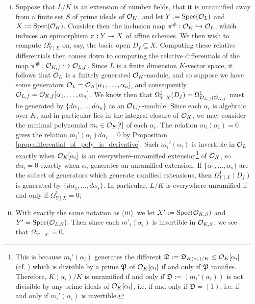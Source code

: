 \begin{eg}
\begin{enumerate}[(i)]
		\item Suppose that $L/K$ is an extension of number fields, that it is unramified away from a finite set $S$ of prime ideals of $\mathcal{O}_K$, and let $Y := \mathrm{Spec}(\mathcal{O}_L)$ and $X := \mathrm{Spec}(\mathcal{O}_K)$. Consider then the inclusion map $\pi^{\#} :\mathcal{O}_K \hookrightarrow \mathcal{O}_L$, which induces an epimorphism $\pi : Y \twoheadrightarrow X$ of affine schemes. We then wish to compute $\Omega^1_{Y \mid X}$ on, say, the basic open $D_f \subseteq X$. Computing these relative differentials then comes down to computing the relative differentials of the map $\pi^{\#} : \mathcal{O}_{K, f} \hookrightarrow \mathcal{O}_{L, f}$. Since $L$ is a finite dimension $K$-vector space, it follows that $\mathcal{O}_L$ is a finitely generated $\mathcal{O}_K$-module, and so suppose we have some generators $\mathcal{O}_L = \mathcal{O}_K[\alpha_1, \ldots, \alpha_n]$, and consequently $\mathcal{O}_{L, f} = \mathcal{O}_{K, f}[\alpha_1, \ldots, \alpha_n]$. We know then that $\Omega^1_{Y \mid X}(D_f) = \Omega^1_{\mathcal{O}_{L, f} \mid \mathcal{O}_{K, f}}$ must be generated by $\{d\alpha_1, \ldots, d\alpha_n\}$ as an $\mathcal{O}_{L, f}$-module. Since each $\alpha_i$ is algebraic over $K$, and in particular lies in the integral closure of $\mathcal{O}_K$, we may consider the minimal polynomial $m_i \in \mathcal{O}_K[t]$ of each $\alpha_i$. The relation $m_i(\alpha_i)=0$ gives the relation $m_i'(\alpha_i) d\alpha_i = 0$ by Proposition \ref{prop:differential_of_poly_is_derivative}. Such $m_i'(\alpha_i)$ is invertible in $\mathcal{O}_L$ exactly when $\mathcal{O}_K[\alpha_i]$ is an everywhere-unramified extension\footnote{This is because $m_i'(\alpha_i)$ generates the different $\mathfrak{D} := \mathfrak{D}_{K(\alpha_i)/K} \trianglelefteq \mathcal{O}_{K}[\alpha_i]$ (cf. \cite[Prop. I.4.6(i)]{casselsFrohlich67}) which is divisible by a prime $\mathfrak{P}$ of $\mathcal{O}_K[\alpha_i]$ if and only if $\mathfrak{P}$ ramifies. Therefore, $K(\alpha_i)/K$ is unramified if and only if $\mathfrak{D} :=(m_i'(\alpha_i))$ is not divisible by any prime ideals of $\mathcal{O}_K[\alpha_i]$, i.e. if and only if $\mathfrak{D} = (1)$, i.e. if and only if $m_i'(\alpha_i)$ is invertible.} of $\mathcal{O}_K$, so $d\alpha_i =0$ exactly when $\alpha_i$ generates an unramified extension. If $\{\alpha_1, \ldots, \alpha_s\}$ are the subset of generators which generate ramified extensions, then $\Omega^1_{Y \mid X} (D_f)$ is generated by $\{d\alpha_1, \ldots, d\alpha_s\}$. In particular, $L/K$ is everywhere-unramified if and only if $\Omega^1_{Y \mid X} = 0$;
		\item With exactly the same notation as (iii), we let $X' := \mathrm{Spec}(\mathcal{O}_{K, S})$ and $Y' = \mathrm{Spec}(\mathcal{O}_{L, S})$. Then since each $m'_i(\alpha_i)$ is invertible in $\mathcal{O}_{K,S}$, we see that $\Omega^1_{Y' \mid X'} = 0$.
	\end{enumerate}
\end{eg}


